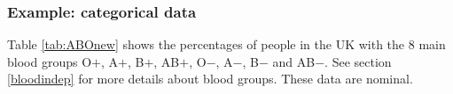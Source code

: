 \documentclass[
  british,
]{book}
\begin{document}
\hypertarget{example-categorical-data}{%
\subsubsection*{Example: categorical data}\label{example-categorical-data}}

Table \ref{tab:ABOnew} shows the percentages of people in the UK with the 8 main blood groups O\(+\), A\(+\), B\(+\), AB\(+\), O\(-\), A\(-\), B\(-\) and AB\(-\). See section \ref{bloodindep} for more details about blood groups. These data are nominal.

\FloatBarrier

 
  \providecommand{\huxb}[2]{\arrayrulecolor[RGB]{#1}\global\arrayrulewidth=#2pt}
  \providecommand{\huxvb}[2]{\color[RGB]{#1}\vrule width #2pt}
  \providecommand{\huxtpad}[1]{\rule{0pt}{#1}}
  \providecommand{\huxbpad}[1]{\rule[-#1]{0pt}{#1}}
\end{document}
